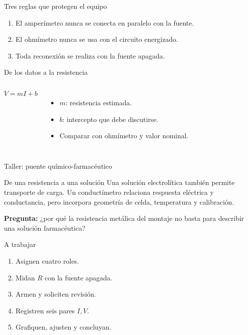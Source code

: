 \documentclass[aspectratio=169,11pt]{beamer}
\begin{document}
\begin{frame}{Tres reglas que protegen el equipo}
\begin{enumerate}
  \item El amperímetro nunca se conecta en paralelo con la fuente.
  \item El ohmímetro nunca se usa con el circuito energizado.
  \item Toda reconexión se realiza con la fuente apagada.
\end{enumerate}
\end{frame}

\begin{frame}{De los datos a la resistencia}
\begin{columns}
\[
V=mI+b
\]
\begin{itemize}
  \item \(m\): resistencia estimada.
  \item \(b\): intercepto que debe discutirse.
  \item Comparar con ohmímetro y valor nominal.
\end{itemize}
\end{columns}
\end{frame}

\begin{frame}{Taller: puente químico-farmacéutico}
\begin{block}{De una resistencia a una solución}
Una solución electrolítica también permite transporte de carga. Un
conductímetro relaciona respuesta eléctrica y conductancia, pero incorpora
geometría de celda, temperatura y calibración.
\end{block}
\vspace{0.4cm}
\textbf{Pregunta:} ¿por qué la resistencia metálica del montaje no basta para
describir una solución farmacéutica?
\end{frame}

\begin{frame}{A trabajar}
\begin{enumerate}
  \item Asignen cuatro roles.
  \item Midan \(R\) con la fuente apagada.
  \item Armen y soliciten revisión.
  \item Registren seis pares \(I,V\).
  \item Grafiquen, ajusten y concluyan.
\end{enumerate}
\end{frame}
\end{document}
